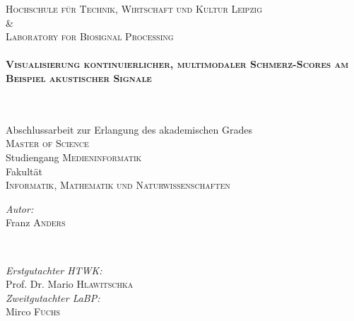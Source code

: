 \begin{titlepage}
\large \textsc{Hochschule für Technik, Wirtschaft und Kultur Leipzig}\\
\& \\
\large \textsc{Laboratory for Biosignal Processing} \\[0.5cm]



\HRule \\[0.4cm]
{ \huge \bfseries \textsc{Visualisierung kontinuierlicher, multimodaler Schmerz-Scores am \\[0.3cm] Beispiel akustischer Signale}}
\subtitle{Masterarbeit}\\[0.2cm] %
\HRule \\[1cm]
 
\large Abschlussarbeit zur Erlangung des akademischen Grades \\ 
\textsc{Master of Science}\\[2cm]

\large Studiengang \textsc{Medieninformatik}\\[1cm]
 \large Fakultät \\ \textsc{Informatik, Mathematik und Naturwissenschaften}\\[1.3cm]


\begin{minipage}{0.4\textwidth}
\begin{flushleft} \large
\emph{Autor:}\\
Franz \textsc{Anders} %
\end{flushleft}
\end{minipage}
~
\begin{minipage}{0.4\textwidth}
\begin{flushright} \large
\emph{Erstgutachter HTWK:} \\
Prof. Dr. Mario \textsc{Hlawitschka} %
\\[0.5cm]
\emph{Zweitgutachter LaBP:} \\
Mirco \textsc{Fuchs}
\end{flushright}
\end{minipage}\\[2cm]


\end{titlepage}
